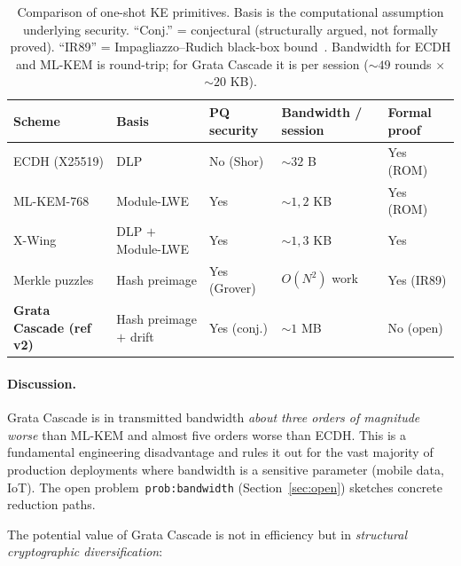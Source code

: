 \documentclass[11pt,a4paper]{article}
\begin{document}
\begin{table}[ht]
\centering
\small
\begin{tabular}{lllll}
\toprule
Scheme & Basis & PQ security & Bandwidth / session & Formal proof \\
\midrule
ECDH (X25519) & DLP & No (Shor) & $\sim 32$ B & Yes (ROM) \\
ML-KEM-768 & Module-LWE & Yes & $\sim 1{,}2$ KB & Yes (ROM) \\
X-Wing~\cite{xwing} & DLP $+$ Module-LWE & Yes & $\sim 1{,}3$ KB & Yes \\
Merkle puzzles~\cite{Merkle1978} & Hash preimage & Yes (Grover) & $O(N^2)$ work & Yes (IR89) \\
\textbf{Grata Cascade (ref v2)} & Hash preimage $+$ drift & Yes (conj.) & $\sim 1$ MB & No (open) \\
\bottomrule
\end{tabular}
\caption{Comparison of one-shot KE primitives. Basis is the computational assumption underlying security. ``Conj.'' = conjectural (structurally argued, not formally proved). ``IR89'' = Impagliazzo--Rudich black-box bound~\cite{IR1989}. Bandwidth for ECDH and ML-KEM is round-trip; for Grata Cascade it is per session ($\sim 49$ rounds $\times$ $\sim 20$ KB).}
\label{tab:comparison}
\end{table}

\paragraph{Discussion.} Grata Cascade is in transmitted bandwidth \emph{about three orders of magnitude worse} than ML-KEM and almost five orders worse than ECDH. This is a fundamental engineering disadvantage and rules it out for the vast majority of production deployments where bandwidth is a sensitive parameter (mobile data, IoT). The open problem~\texttt{prob:bandwidth} (Section~\ref{sec:open}) sketches concrete reduction paths.

The potential value of Grata Cascade is not in efficiency but in \emph{structural cryptographic diversification}:
\end{document}
